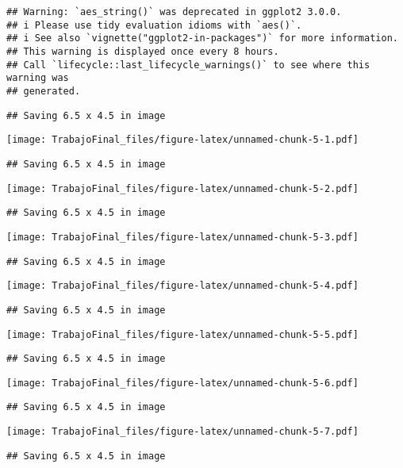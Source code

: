 \documentclass[
]{article}
\begin{document}
\begin{verbatim}
## Warning: `aes_string()` was deprecated in ggplot2 3.0.0.
## i Please use tidy evaluation idioms with `aes()`.
## i See also `vignette("ggplot2-in-packages")` for more information.
## This warning is displayed once every 8 hours.
## Call `lifecycle::last_lifecycle_warnings()` to see where this warning was
## generated.
\end{verbatim}

\begin{verbatim}
## Saving 6.5 x 4.5 in image
\end{verbatim}

\texttt{[image: TrabajoFinal\_files/figure-latex/unnamed-chunk-5-1.pdf]}

\begin{verbatim}
## Saving 6.5 x 4.5 in image
\end{verbatim}

\texttt{[image: TrabajoFinal\_files/figure-latex/unnamed-chunk-5-2.pdf]}

\begin{verbatim}
## Saving 6.5 x 4.5 in image
\end{verbatim}

\texttt{[image: TrabajoFinal\_files/figure-latex/unnamed-chunk-5-3.pdf]}

\begin{verbatim}
## Saving 6.5 x 4.5 in image
\end{verbatim}

\texttt{[image: TrabajoFinal\_files/figure-latex/unnamed-chunk-5-4.pdf]}

\begin{verbatim}
## Saving 6.5 x 4.5 in image
\end{verbatim}

\texttt{[image: TrabajoFinal\_files/figure-latex/unnamed-chunk-5-5.pdf]}

\begin{verbatim}
## Saving 6.5 x 4.5 in image
\end{verbatim}

\texttt{[image: TrabajoFinal\_files/figure-latex/unnamed-chunk-5-6.pdf]}

\begin{verbatim}
## Saving 6.5 x 4.5 in image
\end{verbatim}

\texttt{[image: TrabajoFinal\_files/figure-latex/unnamed-chunk-5-7.pdf]}

\begin{verbatim}
## Saving 6.5 x 4.5 in image
\end{verbatim}
\end{document}
